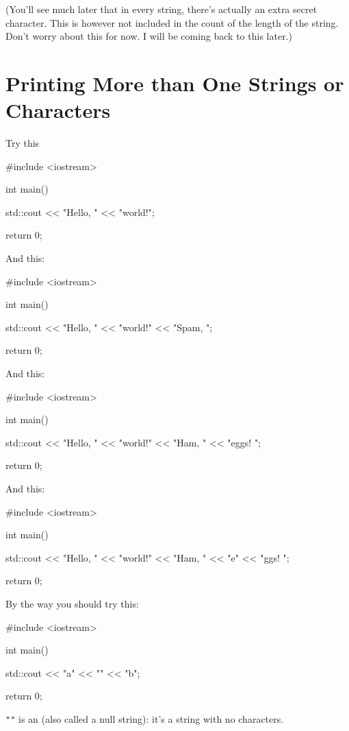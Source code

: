 

(You'll see much later that in every string, there's actually an extra secret character. This is however not included in the count of the length of the string. Don't worry about this for now. I will be coming back to this later.)









\newpage\section{Printing More than One Strings or Characters}

Try this
\begin{console}
#include <iostream>

int main()
{
    std::cout << "Hello, " << "world!\n";

    return 0;
}
\end{console}
And this:
\begin{console}
#include <iostream>

int main()
{
	std::cout << "Hello, " << "world!\n"
                  << "Spam, \n";

	return 0;
}
\end{console}
And this:
\begin{console}
#include <iostream>

int main()
{
	std::cout << "Hello, " << "world!\n"
                  << "Ham, " << "eggs! \n";

	return 0;
}
\end{console}
And this:
\begin{console}
#include <iostream>

int main()
{
	std::cout << "Hello, " << "world!\n"
                  << "Ham, " << "e" << "ggs! \n";

	return 0;
}
\end{console}

By the way you should try this:
\begin{console}
#include <iostream>

int main()
{
    std::cout << "a" << "" << "b";

    return 0;
}
\end{console}

\verb!""! 
is an 
(also called a null string): 
it's a string with no characters.


